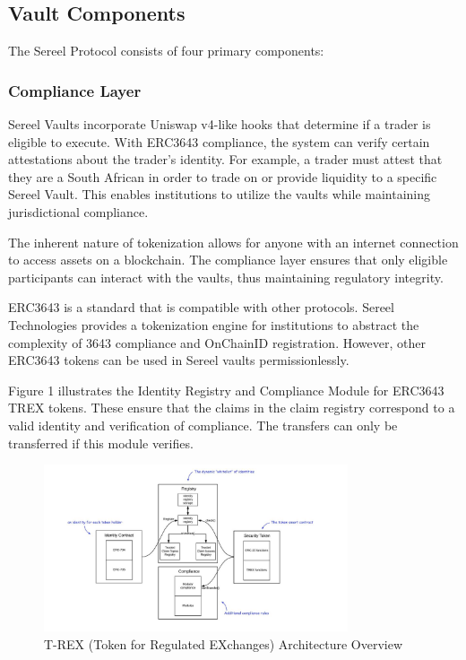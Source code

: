 \documentclass[12pt]{article}
\begin{document}
\subsection{Vault Components}

The Sereel Protocol consists of four primary components:

\subsubsection{Compliance Layer}
Sereel Vaults incorporate Uniswap v4-like hooks that determine if a trader is eligible to execute. With ERC3643 compliance, the system can verify certain attestations about the trader's identity. For example, a trader must attest that they are a South African in order to trade on or provide liquidity to a specific Sereel Vault. This enables institutions to utilize the vaults while maintaining jurisdictional compliance. 

The inherent nature of tokenization allows for anyone with an internet connection to access assets on a blockchain. The compliance layer ensures that only eligible participants can interact with the vaults, thus maintaining regulatory integrity.

ERC3643 is a standard that is compatible with other protocols. Sereel Technologies provides a tokenization engine for institutions to abstract the complexity of 3643 compliance and OnChainID registration. However, other ERC3643 tokens can be used in Sereel vaults permissionlessly.

Figure 1 illustrates the Identity Registry and Compliance Module for ERC3643 TREX tokens. These ensure that the claims in the claim registry correspond to a valid identity and verification of compliance. The transfers can only be transferred if this module verifies.

\begin{figure}[h]
    \centering
    \includegraphics[width=0.8\textwidth]{trex.jpeg}
    \caption{T-REX (Token for Regulated EXchanges) Architecture Overview}
    \label{fig:trex-diagram}
\end{figure}
\end{document}
